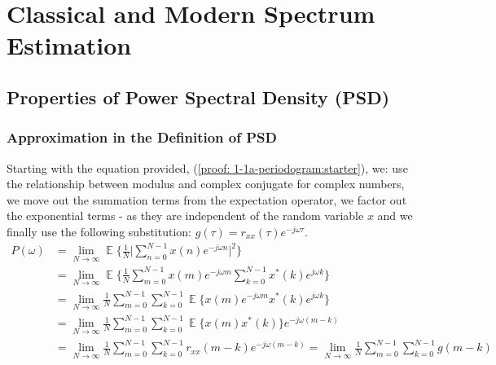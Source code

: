 \documentclass[12pt]{article}
\date{April 2019}
\DeclareMathOperator*{\E}{\mathbb{E}}
\begin{document}


\newpage
\setcounter{tocdepth}{2} %
\tableofcontents
\newpage
\section{Classical and Modern Spectrum Estimation} \label{sec: 1-CMSE}
	\subsection{Properties of Power Spectral Density (PSD)} \label{sec: 1-1-prop-PSD}
	
	\subsubsection{Approximation in the Definition of PSD} \label{sec: 1-1a-prop-PSD}
	Starting with the equation provided, (\ref{proof: 1-1a-periodogram:starter}), we: use the relationship between modulus and complex conjugate for complex numbers, we move out the summation terms from the expectation operator, we factor out the exponential terms - as they are independent of the random variable $x$ and we finally use the following substitution:  $g(\tau) = r_{xx}(\tau) e^{-j\omega\tau}$.
	\begin{align}
		P(\omega)   & =\lim_{N\to\infty} \E \bigg\{ \frac{1}{N} \bigg| \sum_{n=0}^{N-1} x(n) e^{-j\omega n} \bigg|^{2} \bigg\}
		\label{proof: 1-1a-periodogram:starter}\\
		& = \lim_{N\to\infty} \E \bigg\{\frac{1}{N}
		\sum_{m=0}^{N-1} x(m) e^{-j\omega m} \sum_{k=0}^{N-1} x^{*}(k) e^{j\omega k} \bigg\}\nonumber\\
		& = \lim_{N\to\infty} \frac{1}{N}
		\sum_{m=0}^{N-1} \sum_{k=0}^{N-1} \E \bigg\{ x(m) e^{-j\omega m} x^{*}(k) e^{j\omega k} \bigg\}\nonumber\\
		& = \lim_{N\to\infty} \frac{1}{N}
		\sum_{m=0}^{N-1} \sum_{k=0}^{N-1} \E \bigg\{ x(m) x^{*}(k) \bigg\} e^{-j\omega(m-k)} \nonumber\\
		& = \lim_{N\to\infty} \frac{1}{N}
		\sum_{m=0}^{N-1} \sum_{k=0}^{N-1} r_{xx}(m-k) e^{-j\omega(m-k)}
		= \lim_{N\to\infty} \frac{1}{N}
		\sum_{m=0}^{N-1} \sum_{k=0}^{N-1} g(m-k)
		\label{proof: 1-1a-periodogram}
	\end{align}
	
\end{document}

